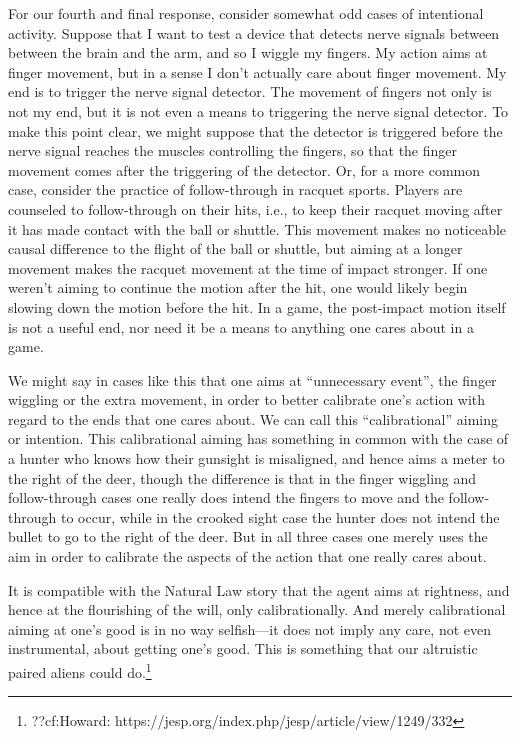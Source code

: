 For our fourth and final response, consider somewhat odd cases of intentional activity. Suppose that
I want to test a device that detects nerve signals between between the brain and the arm, and so I wiggle my fingers. My action aims
at finger movement, but in a sense I don't actually care about finger movement. My end is to trigger the nerve signal detector.
The movement of fingers not only is not my end, but it is not even a means to triggering the nerve signal detector. To make this
point clear, we might suppose that the detector is triggered before the nerve signal reaches the muscles controlling the fingers,
so that the finger movement comes after the triggering of the detector. Or, for a more common case, consider the practice of
follow-through in racquet sports. Players are counseled to follow-through on their hits, i.e., to keep their racquet moving after 
it has made contact with the ball or shuttle. This movement makes no noticeable causal difference to the flight of the ball or 
shuttle, but aiming at a longer movement makes the racquet movement at the time of impact stronger. If one weren't aiming to continue 
the motion after the hit, one would likely begin slowing down the motion before the hit. In a game, the post-impact motion itself is not 
a useful end, nor need it be a means to anything one cares about in a game.

We might say in cases like this that one aims at ``unnecessary event'', the finger wiggling or the extra movement, in order to 
better calibrate one's action with regard to the ends that one cares about. We can call this ``calibrational'' aiming or
intention. This calibrational aiming has something in common with the case of a hunter who knows how their gunsight is misaligned,
and hence aims a meter to the right of the deer, though the difference is that in the finger wiggling and follow-through
cases one really does intend the fingers to move and the follow-through to occur, while in the crooked sight case the hunter does
not intend the bullet to go to the right of the deer. But in all three cases one merely uses the aim in order to calibrate the 
aspects of the action that one really cares about. 

It is compatible with the Natural Law story that the agent aims at rightness, and hence at the flourishing of the will, only
calibrationally. And merely calibrational aiming at one's good is in no way selfish---it does not imply any care, not even instrumental,
about getting one's good. This is something that our altruistic paired aliens could do.\footnote{??cf:Howard: https://jesp.org/index.php/jesp/article/view/1249/332}

